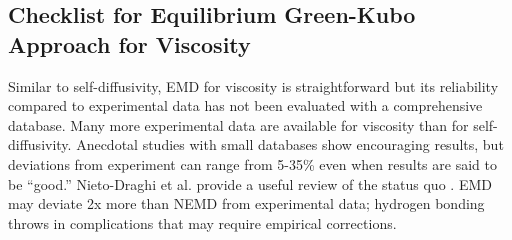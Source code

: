 \documentclass[9pt]{livecoms}
\begin{document}
\subsection{Checklist for Equilibrium Green-Kubo Approach for Viscosity}

Similar to self-diffusivity, EMD for viscosity is straightforward but its reliability compared to experimental data has not been evaluated with a comprehensive database. Many more experimental data are available for viscosity than for self-diffusivity. Anecdotal studies with small databases show encouraging results, but deviations from experiment can range from 5-35\% even when results are said to be “good.” Nieto-Draghi et al. provide a useful review of the status quo \cite{Nieto2015}. EMD may deviate 2x more than NEMD from experimental data; hydrogen bonding throws in complications that may require empirical corrections. 


\end{document}
